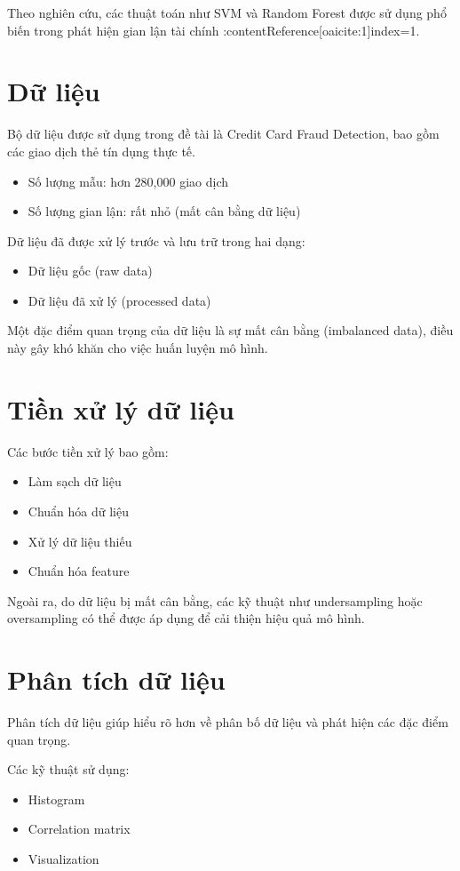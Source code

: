 Theo nghiên cứu, các thuật toán như SVM và Random Forest được sử dụng phổ biến trong phát hiện gian lận tài chính :contentReference[oaicite:1]{index=1}.
\section{Dữ liệu}

Bộ dữ liệu được sử dụng trong đề tài là Credit Card Fraud Detection, bao gồm các giao dịch thẻ tín dụng thực tế.

\begin{itemize}
    \item Số lượng mẫu: hơn 280,000 giao dịch
    \item Số lượng gian lận: rất nhỏ (mất cân bằng dữ liệu)
\end{itemize}

Dữ liệu đã được xử lý trước và lưu trữ trong hai dạng:
\begin{itemize}
    \item Dữ liệu gốc (raw data)
    \item Dữ liệu đã xử lý (processed data)
\end{itemize}

Một đặc điểm quan trọng của dữ liệu là sự mất cân bằng (imbalanced data), điều này gây khó khăn cho việc huấn luyện mô hình.
\section{Tiền xử lý dữ liệu}

Các bước tiền xử lý bao gồm:

\begin{itemize}
    \item Làm sạch dữ liệu
    \item Chuẩn hóa dữ liệu
    \item Xử lý dữ liệu thiếu
    \item Chuẩn hóa feature
\end{itemize}

Ngoài ra, do dữ liệu bị mất cân bằng, các kỹ thuật như undersampling hoặc oversampling có thể được áp dụng để cải thiện hiệu quả mô hình.
\section{Phân tích dữ liệu}

Phân tích dữ liệu giúp hiểu rõ hơn về phân bố dữ liệu và phát hiện các đặc điểm quan trọng.

Các kỹ thuật sử dụng:
\begin{itemize}
    \item Histogram
    \item Correlation matrix
    \item Visualization
\end{itemize}

